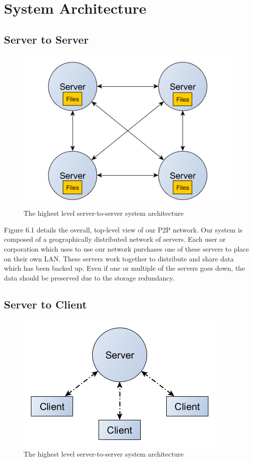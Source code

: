 \chapter{System Architecture}


\section{Server to Server}

\begin{figure}[hb]
\centering
\includegraphics[scale=0.5]{images/architechure-diagram-server-server.png}
\caption{The highest level server-to-server system architecture}
\end{figure}

Figure 6.1 details the overall, top-level view of our P2P network.  Our system is composed of a geographically distributed network of servers.  Each user or corporation which uses to use our network purchases one of these servers to place on their own LAN.  These servers work together to distribute and share data which has been backed up.  Even if one or multiple of the servers goes down, the data should be preserved due to the storage redundancy.

\clearpage


\section{Server to Client}

\begin{figure}[hb]
\centering
\includegraphics[scale=0.5]{images/architechure-diagram-server-client3.png}
\caption{The highest level server-to-server system architecture}
\end{figure}

